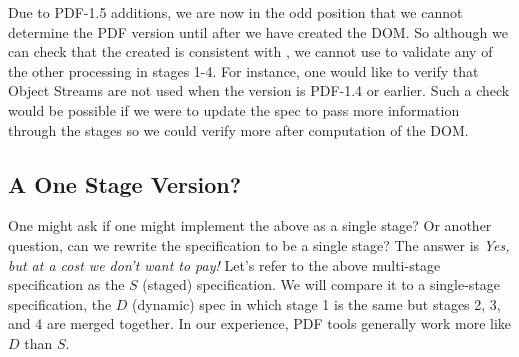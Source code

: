 Due to PDF-1.5 additions, we are now in the odd position that we
cannot determine the PDF version until after we have created the DOM.
So although we
can check that the created  is consistent with
,
% 
we cannot use  to validate any of the other processing
in stages 1-4.
%
For instance, one would like to verify that Object Streams are not
used when the version is PDF-1.4 or earlier.
%
Such a check would be possible if we were to update the spec to pass
more information through the stages so we could verify more after
computation of the DOM.


\subsection{A One Stage Version?}
\label{sec:single-pass-problems}

\newcommand{\ssp}{$S$}
\newcommand{\dsp}{$D$}

One might ask if one might implement the above as a single stage?
Or another question, can we rewrite the specification to be a single stage?
The answer is \emph{Yes, but at a cost we don't want to pay!}
Let's refer to the above multi-stage specification as the \ssp{}
(staged) specification.
%
We will compare it to a single-stage specification, the \dsp{}
(dynamic) spec in which stage 1 is the same but stages 2, 3, and 4 are
merged together.
%
In our experience, PDF tools generally work more like \dsp{} than \ssp{}.

